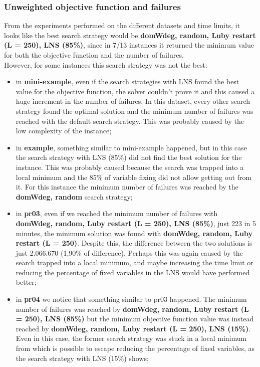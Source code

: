\subsubsection{Unweighted objective function and failures}
\label{subsubsec:failures-unweighted-obj-fun}
From the experiments performed on the different datasets and time limits, it looks like the best search strategy would be \textbf{domWdeg, random, Luby restart (L = 250), LNS (85\%)}, since in 7/13 instances it returned the minimum value for both the objective function and the number of failures.\\
However, for some instances this search strategy was not the best:
\begin{itemize}
    \item in \textbf{mini-example}, even if the search strategies with LNS found the best value for the objective function, the solver couldn't prove it and this caused a huge increment in the number of failures. In this dataset, every other search strategy found the optimal solution and the minimum number of failures was reached with the default search strategy. This was probably caused by the low complexity of the instance;
    \item in \textbf{example}, something similar to mini-example happened, but in this case the search strategy with LNS (85\%) did not find the best solution for the instance. This was probably caused because the search was trapped into a local minimum and the 85\% of variable fixing did not allow getting out from it. For this instance the minimum number of failures was reached by the \textbf{domWdeg, random} search strategy;
    \item in \textbf{pr03}, even if we reached the minimum number of failures with \textbf{domWdeg, random, Luby restart (L = 250), LNS (85\%)}, just 223 in 5 minutes, the minimum solution was found with \textbf{domWdeg, random, Luby restart (L = 250)}. Despite this, the difference between the two solutions is just 2.066.670 (1,90\% of difference). Perhaps this was again caused by the search trapped into a local minimum, and maybe increasing the time limit or reducing the percentage of fixed variables in the LNS would have performed better;
    \item in \textbf{pr04} we notice that something similar to pr03 happened. The minimum number of failures was reached by \textbf{domWdeg, random, Luby restart (L = 250), LNS (85\%)} but the minimum objective function value was instead reached by \textbf{domWdeg, random, Luby restart (L = 250), LNS (15\%)}. Even in this case, the former search strategy was stuck in a local minimum from which is possible to escape reducing the percentage of fixed variables, as the search strategy with  LNS (15\%) shows;

\end{itemize}
